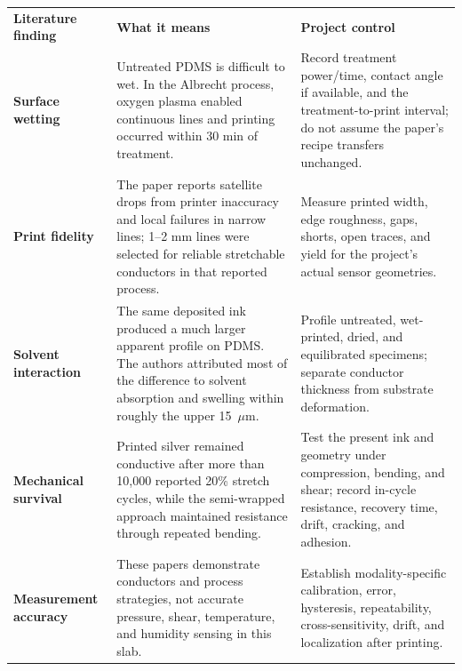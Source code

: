 \vspace{0.65em}
\begingroup
\fontsize{8.55}{10.05}\selectfont
\renewcommand{\arraystretch}{1.11}
\begin{tabularx}{\linewidth}{>{\raggedright\arraybackslash\bfseries\color{AUBRed}}p{2.5cm}Y Y}
\color{white}\textbf{Literature finding} &
\color{white}\textbf{What it means} &
\color{white}\textbf{Project control} \\
Surface wetting & Untreated PDMS is difficult to wet. In the Albrecht process,
oxygen plasma enabled continuous lines and printing occurred within 30 min of
treatment. & Record treatment power/time, contact angle if available, and the
treatment-to-print interval; do not assume the paper's recipe transfers
unchanged. \\
Print fidelity & The paper reports satellite drops from printer inaccuracy and
local failures in narrow lines; 1--2 mm lines were selected for reliable
stretchable conductors in that reported process. & Measure printed width,
edge roughness, gaps, shorts, open traces, and yield for the project's actual
sensor geometries. \\
Solvent interaction & The same deposited ink produced a much larger apparent
profile on PDMS. The authors attributed most of the difference to solvent
absorption and swelling within roughly the upper 15~$\mu$m. & Profile untreated,
wet-printed, dried, and equilibrated specimens; separate conductor thickness
from substrate deformation. \\
Mechanical survival & Printed silver remained conductive after more than
10,000 reported 20\% stretch cycles, while the semi-wrapped approach maintained
resistance through repeated bending. & Test the present ink and geometry under
compression, bending, and shear; record in-cycle resistance, recovery time,
drift, cracking, and adhesion. \\
Measurement accuracy & These papers demonstrate conductors and process
strategies, not accurate pressure, shear, temperature, and humidity sensing in
this slab. & Establish modality-specific calibration, error, hysteresis,
repeatability, cross-sensitivity, drift, and localization after printing. \\
\end{tabularx}
\endgroup
{}

\vspace{0.5em}

